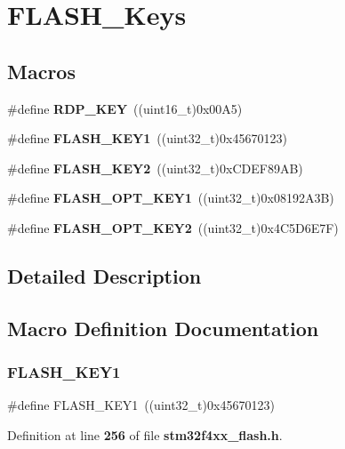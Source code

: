\section{F\+L\+A\+S\+H\+\_\+\+Keys}
\label{group__FLASH__Keys}
\subsection*{Macros}
\begin{DoxyCompactItemize}
\item 
\#define \textbf{ R\+D\+P\+\_\+\+K\+EY}~((uint16\+\_\+t)0x00\+A5)
\item 
\#define \textbf{ F\+L\+A\+S\+H\+\_\+\+K\+E\+Y1}~((uint32\+\_\+t)0x45670123)
\item 
\#define \textbf{ F\+L\+A\+S\+H\+\_\+\+K\+E\+Y2}~((uint32\+\_\+t)0x\+C\+D\+E\+F89\+A\+B)
\item 
\#define \textbf{ F\+L\+A\+S\+H\+\_\+\+O\+P\+T\+\_\+\+K\+E\+Y1}~((uint32\+\_\+t)0x08192\+A3\+B)
\item 
\#define \textbf{ F\+L\+A\+S\+H\+\_\+\+O\+P\+T\+\_\+\+K\+E\+Y2}~((uint32\+\_\+t)0x4\+C5\+D6\+E7\+F)
\end{DoxyCompactItemize}


\subsection{Detailed Description}


\subsection{Macro Definition Documentation}
\mbox{\label{group__FLASH__Keys_gafd77e7bf91765d891ce63e2f0084b019}} 
\subsubsection{F\+L\+A\+S\+H\+\_\+\+K\+E\+Y1}
{\footnotesize\ttfamily \#define F\+L\+A\+S\+H\+\_\+\+K\+E\+Y1~((uint32\+\_\+t)0x45670123)}



Definition at line \textbf{ 256} of file \textbf{ stm32f4xx\+\_\+flash.\+h}.

\mbox{\label{group__FLASH__Keys_gaee83d0f557e158da52f4a205db6b60a7}} 
